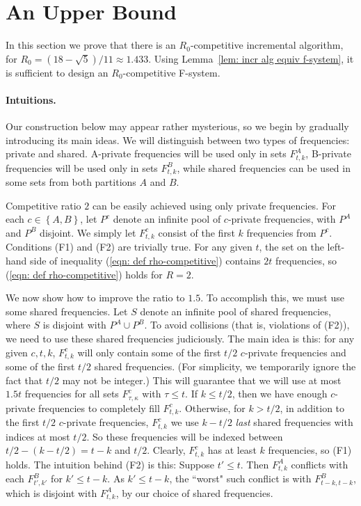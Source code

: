 \documentclass[11pt]{article}
\newcommand{\braced}[1]{{ \left\{ #1 \right\} }}
\begin{document}
\section{An Upper Bound}
\label{sec: an upper bound}

In this section we prove that there is an $R_0$-competitive
incremental algorithm, for $R_0 = (18-\sqrt{5})/11\approx 1.433$.
Using Lemma~\ref{lem: incr alg equiv f-system}, it is sufficient to
design an $R_0$-competitive F-system.



\paragraph{Intuitions.}
Our construction below may appear rather mysterious, so we begin by
gradually introducing its main ideas.
We will distinguish between two types of frequencies: private and
shared. A-private frequencies will be used only in sets $F^A_{t,k}$,
B-private frequencies will be used only in sets $F^B_{t,k}$,
while shared frequencies can be used in some sets from both partitions
$A$ and $B$.

Competitive ratio $2$ can be easily achieved using only private frequencies. For
each $c\in \braced{A,B}$,
let $P^c$ denote an infinite pool of $c$-private frequencies, 
with $P^A$ and $P^B$ disjoint. We
simply let $F^c_{t,k}$ consist of the first $k$ frequencies from $P^c$.
Conditions (F1) and (F2) are trivially true.
For any given $t$, the set on the left-hand side of 
inequality (\ref{eqn: def rho-competitive}) contains $2t$ frequencies,
so (\ref{eqn: def rho-competitive}) holds for $R = 2$.

We now show how to improve the ratio to $1.5$. To accomplish this,
we must use some shared frequencies.
Let $S$ denote an infinite pool of shared frequencies, where $S$ is
disjoint with $P^A\cup P^B$.
To avoid collisions (that is, violations of (F2)), we need
to use these shared frequencies judiciously. The main idea is this: for
any given $c,t,k$, $F^c_{t,k}$ will only contain some of the first
$t/2$ $c$-private frequencies and some of the first $t/2$ shared
frequencies. (For simplicity, we temporarily
ignore the fact that $t/2$ may not be integer.) 
This will guarantee that we will use at most $1.5t$
frequencies for all sets $F^c_{\tau,\kappa}$ with $\tau\le t$.
If $k\le t/2$, then we have enough $c$-private frequencies to completely fill
$F^c_{t,k}$. Otherwise, for $k > t/2$,
in addition to the first $t/2$ $c$-private frequencies,
$F^c_{t,k}$ we use $k-t/2$ \emph{last} shared
frequencies with indices at most $t/2$. So these frequencies will be
indexed between $t/2 - (k-t/2) = t-k$ and $t/2$. Clearly,
$F^c_{t,k}$ has at least $k$ frequencies, so (F1) holds.
The intuition behind (F2) is this: Suppose $t'\le t$. Then
$F^A_{t,k}$ conflicts with each $F^B_{t',k'}$ for $k' \le t-k$.
As $k'\le t-k$, the ``worst" such conflict is with $F^B_{t-k,t-k}$, which 
is disjoint with $F^A_{t,k}$, by our choice of shared frequencies.
\end{document}

